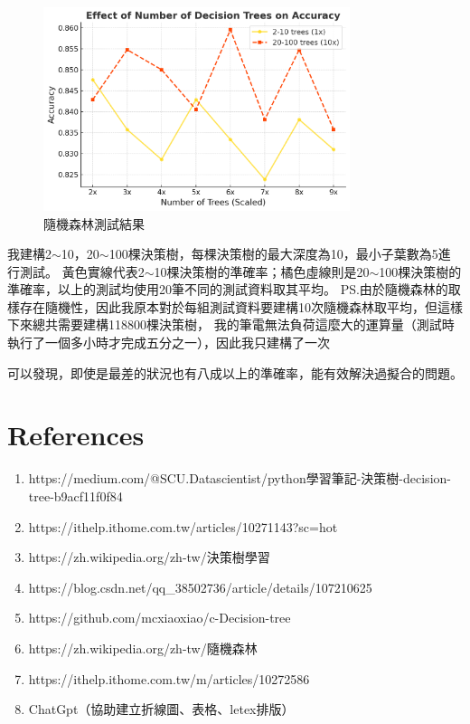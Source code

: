\documentclass[11pt,a4paper]{extarticle}
\begin{document}
    \begin{figure}[H]
        \centering
        \includegraphics[width=0.8\textwidth]{src/picture3.png}
        \caption{隨機森林測試結果}
    \end{figure}
    我建構2$\sim$10，20$\sim$100棵決策樹，每棵決策樹的最大深度為10，最小子葉數為5進行測試。
    黃色實線代表2$\sim$10棵決策樹的準確率；橘色虛線則是20$\sim$100棵決策樹的準確率，以上的測試均使用20筆不同的測試資料取其平均。
    PS.由於隨機森林的取樣存在隨機性，因此我原本對於每組測試資料要建構10次隨機森林取平均，但這樣下來總共需要建構118800棵決策樹，
    我的筆電無法負荷這麼大的運算量（測試時執行了一個多小時才完成五分之一），因此我只建構了一次

    可以發現，即使是最差的狀況也有八成以上的準確率，能有效解決過擬合的問題。

    \newpage
    \section*{References}
    \begin{enumerate}
        \item https://medium.com/@SCU.Datascientist/python學習筆記-決策樹-decision-tree-b9acf11f0f84
        \item https://ithelp.ithome.com.tw/articles/10271143?sc=hot
        \item https://zh.wikipedia.org/zh-tw/決策樹學習
        \item https://blog.csdn.net/qq\_38502736/article/details/107210625
        \item https://github.com/mcxiaoxiao/c-Decision-tree
        \item https://zh.wikipedia.org/zh-tw/隨機森林
        \item https://ithelp.ithome.com.tw/m/articles/10272586
        \item ChatGpt（協助建立折線圖、表格、letex排版）
    \end{enumerate}
\end{document}
